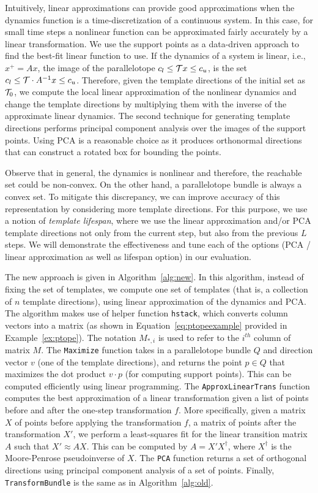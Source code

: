 Intuitively, linear approximations can provide good approximations when the dynamics function is a time-discretization of a continuous system.
%
In this case, for small time steps a nonlinear function can be approximated fairly accurately by a linear transformation.
%
We use the support points as a data-driven approach to find the best-fit linear function to use.
%
If the dynamics of a system is linear, i.e., $x^{+} = Ax$, the image of the parallelotope $c_{l} \leq {\cal T} x \leq c_{u}$, is the set $c_{l} \leq {\cal T} \cdot A^{-1} x \leq c_{u}$.
%
Therefore, given the template directions of the initial set as ${\cal T}_0$, we compute the local linear approximation of the nonlinear dynamics and change the template directions by multiplying them with the inverse of the approximate linear dynamics.
%
The second technique for generating template directions performs principal component analysis over the images of the support points.
%
Using PCA is a reasonable choice as it produces orthonormal directions that can construct a rotated box for bounding the points.
%

Observe that in general, the dynamics is nonlinear and therefore, the reachable set could be non-convex.
%
On the other hand, a parallelotope bundle is always a convex set.
%
To mitigate this discrepancy, we can improve accuracy of this representation by considering more template directions.
%
For this purpose, we use a notion of \emph{template lifespan}, where we use the linear approximation and/or PCA template directions not only from the current step, but also from the previous $L$ steps.
%
We will demonstrate the effectiveness and tune each of the options (PCA / linear approximation as well as lifespan option) in our evaluation.

The new approach is given in Algorithm~\ref{alg:new}.
%
In this algorithm, instead of fixing the set of templates, we compute one set of templates (that is, a collection of $n$ template directions), using linear approximation of the dynamics and PCA.
%
The algorithm makes use of helper function \texttt{hstack}, which converts column vectors into a matrix (as shown in Equation~\ref{eq:ptopeexample} provided in Example~\ref{ex:ptope}).
%
The notation $M_{*,i}$ is used to refer to the $i^{th}$ column of matrix $M$.
%
The \texttt{Maximize} function takes in a parallelotope bundle $Q$ and direction vector $v$ (one of the template directions), and returns the point $p \in Q$ that maximizes the dot product $v \cdot p$ (for computing support points).
%
This can be computed efficiently using linear programming.
%
The \texttt{ApproxLinearTrans} function computes the best approximation of a linear transformation given a list of points before and after the one-step transformation $f$.
%
More specifically, given a matrix $X$ of points before applying the transformation $f$, a matrix of points after the transformation $X'$, we perform a least-squares fit for the linear transition matrix $A$ such that $X' \approx AX$.
%
This can be computed by $A = X' X^\dagger$, where $X^\dagger$ is the Moore-Penrose pseudoinverse of $X$.
%
The \texttt{PCA} function returns a set of orthogonal directions using principal component analysis of a set of points.
%
Finally, \texttt{TransformBundle} is the same as in Algorithm~\ref{alg:old}.

